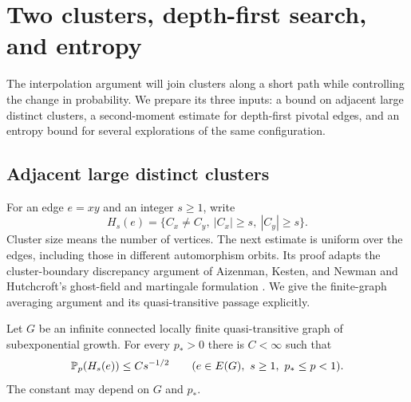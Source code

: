 \section{Two clusters, depth-first search, and entropy}
\label{sec:dfs-entropy}

The interpolation argument will join clusters along a short path while
controlling the change in probability. We prepare its three inputs: a
bound on adjacent large distinct clusters, a second-moment estimate for
depth-first pivotal edges, and an entropy bound for several explorations
of the same configuration.

\subsection{Adjacent large distinct clusters}

For an edge $e=xy$ and an integer $s\ge1$, write
\[
 H_s(e)=\{C_x\ne C_y,\ |C_x|\ge s,\ |C_y|\ge s\}.
\]
Cluster size means the number of vertices. The next estimate is uniform
over the edges, including those in different automorphism orbits.
Its proof adapts the cluster-boundary discrepancy argument of
Aizenman, Kesten, and Newman \cite[Section~3]{AizenmanKestenNewman1987}
and Hutchcroft's ghost-field and martingale formulation
\cite[Section~3]{Hutchcroft2020Locality}.
We give the finite-graph averaging argument and its quasi-transitive
passage explicitly.

\begin{proposition}\label{prop:two-cluster}
Let $G$ be an infinite connected locally finite quasi-transitive graph
of subexponential growth. For every $p_*>0$ there is $C<\infty$ such
that
\[
 \mathbb P_p(H_s(e))\le C s^{-1/2}
 \qquad(e\in E(G),\ s\ge1,\ p_*\le p<1).
\]
The constant may depend on $G$ and $p_*$.
\end{proposition}

